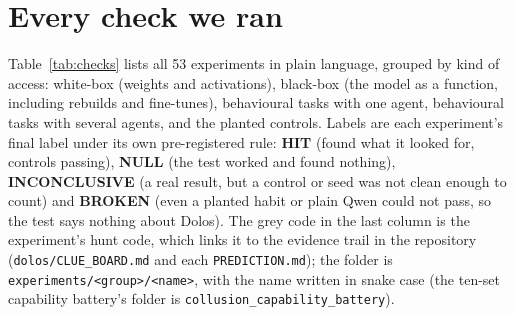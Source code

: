 \section{Every check we ran}
\label{app:checks}

Table~\ref{tab:checks} lists all 53 experiments in plain language, grouped by kind of access:
white-box (weights and activations), black-box (the model as a function, including rebuilds and
fine-tunes), behavioural tasks with one agent, behavioural tasks with several agents, and the
planted controls.
Labels are each experiment's final label under its own pre-registered rule: \textbf{HIT} (found what
it looked for, controls passing), \textbf{NULL} (the test worked and found nothing),
\textbf{INCONCLUSIVE} (a real result, but a control or seed was not clean enough to count) and
\textbf{BROKEN} (even a planted habit or plain Qwen could not pass, so the test says nothing about
Dolos).
The grey code in the last column is the experiment's hunt code, which links it to the evidence trail
in the repository (\texttt{dolos/CLUE\_BOARD.md} and each \texttt{PREDICTION.md}); the folder is
\texttt{experiments/<group>/<name>}, with the name written in snake case (the ten-set capability
battery's folder is \texttt{collusion\_capability\_battery}).

